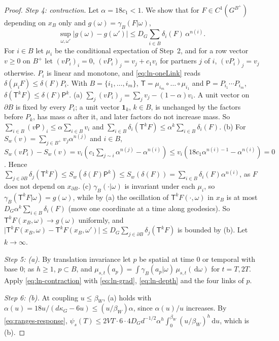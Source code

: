 \documentclass[11pt,a4paper]{amsart}
\theoremstyle{definition}
\theoremstyle{remark}
\numberwithin{equation}{section}
\newcommand{\abs}[1]{\lvert #1\rvert}      %
\newcommand{\dd}{\,\mathrm{d}}             %
\newcommand{\psiT}[2]{\psi_{#1}(#2)}       %
\newcommand{\betaW}{\beta_{W}}             %
\begin{document}
\begin{proof}
\emph{Step 4: contraction.} Let $\alpha=18c_1<1$. We show that for $F\in C^1(G^{B^+})$ depending on $x_B$ only and $g(\omega)=\gamma_B(F|\omega)$,
\begin{equation}\label{eq:ln-contraction}
\sup_{\omega,\omega'}\abs{g(\omega)-g(\omega')}\le D_G\sum_{i\in B}\delta_i(F)\,\alpha^{n(i)}.
\end{equation}
For $i\in B$ let $\mu_i$ be the conditional expectation of Step~2, and for a row vector $v\ge0$ on $B^+$ let $(vP_i)_i=0$, $(vP_i)_j=v_j+c_1v_i$ for partners $j$ of $i$, $(vP_i)_j=v_j$ otherwise. $P_i$ is linear and monotone, and \eqref{eq:ln-oneLink} reads $\delta(\mu_iF)\le\delta(F)P_i$. With $B=\{i_1,\dots,i_m\}$, $\mathsf T=\mu_{i_m}\circ\dots\circ\mu_{i_1}$ and $\mathsf P=P_{i_1}\cdots P_{i_m}$, $\delta(\mathsf T^kF)\le\delta(F)\mathsf P^k$.
(a) $\sum_j(vP_i)_j=\sum_jv_j-(1-\alpha)v_i$. A unit vector on $\partial B$ is fixed by every $P_i$; a unit vector $\mathbf 1_k$, $k\in B$, is unchanged by the factors before $P_k$, has mass $\alpha$ after it, and later factors do not increase mass. So $\sum_{i\in B}(v\mathsf P)_i\le\alpha\sum_{i\in B}v_i$ and $\sum_{i\in B}\delta_i(\mathsf T^kF)\le\alpha^k\sum_{i\in B}\delta_i(F)$.
(b) For $S_w(v)=\sum_{j\in B^+}v_j\alpha^{n(j)}$ and $i\in B$, $S_w(vP_i)-S_w(v)=v_i(c_1\sum_{j\sim i}\alpha^{n(j)}-\alpha^{n(i)})\le v_i(18c_1\alpha^{n(i)-1}-\alpha^{n(i)})=0$. Hence $\sum_{j\in\partial B}\delta_j(\mathsf T^kF)\le S_w(\delta(F)\mathsf P^k)\le S_w(\delta(F))=\sum_{i\in B}\delta_i(F)\alpha^{n(i)}$, as $F$ does not depend on $x_{\partial B}$.
(c) $\gamma_B(\cdot|\omega)$ is invariant under each $\mu_i$, so $\gamma_B(\mathsf T^kF|\omega)=g(\omega)$, while by (a) the oscillation of $\mathsf T^kF(\cdot,\omega)$ in $x_B$ is at most $D_G\alpha^k\sum_{i\in B}\delta_i(F)$ (move one coordinate at a time along geodesics). So $\mathsf T^kF(x_B,\omega)\to g(\omega)$ uniformly, and $\abs{\mathsf T^kF(x_B,\omega)-\mathsf T^kF(x_B,\omega')}\le D_G\sum_{j\in\partial B}\delta_j(\mathsf T^kF)$ is bounded by (b). Let $k\to\infty$.

\emph{Step 5: \textup{(a)}.} By translation invariance let $p$ be spatial at time $0$ or temporal with base $0$; as $h\ge1$, $p\subset B$, and $\mu_{s,t}(a_p)=\int\gamma_B(a_p|\omega)\,\mu_{s,t}(\dd\omega)$ for $t=T,2T$. Apply \eqref{eq:ln-contraction} with \eqref{eq:ln-grad}, \eqref{eq:ln-depth} and the four links of $p$.

\emph{Step 6: \textup{(b)}.} At coupling $u\le\betaW$, (a) holds with $\alpha(u)=18u/(d\kappa_G-6u)\le(u/\betaW)\alpha$, since $\alpha(u)/u$ increases. By \eqref{eq:ranges-response}, $\psiT{s}{T}\le2VT\cdot6\cdot4D_Gd^{-1/2}\alpha^h\int_0^{\betaW}(u/\betaW)^h\dd u$, which is (b).


\end{proof}
\end{document}
